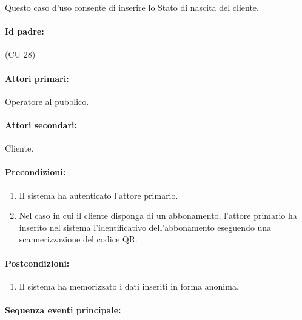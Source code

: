 \documentclass{article}
\begin{document}
	\indent\indent Questo caso d'uso consente di inserire lo Stato di nascita del cliente.
	
	\paragraph{Id padre:}(CU 28)
	
	\paragraph{Attori primari:}Operatore al pubblico.
	
	\paragraph{Attori secondari:}Cliente.
	
	\paragraph{Precondizioni:}
	\begin{enumerate}[itemsep=8pt,parsep=0pt]
		\item Il sistema ha autenticato l'attore primario.
		\item Nel caso in cui il cliente disponga di un abbonamento, l'attore primario ha inserito nel sistema l'identificativo dell'abbonamento eseguendo una scannerizzazione del codice QR.
	\end{enumerate}

	\paragraph{Postcondizioni:}
	\begin{enumerate}[itemsep=8pt,parsep=0pt]
		\item Il sistema ha memorizzato i dati inseriti in forma anonima.
	\end{enumerate}
	
	\paragraph{Sequenza eventi principale:}
\end{document}
